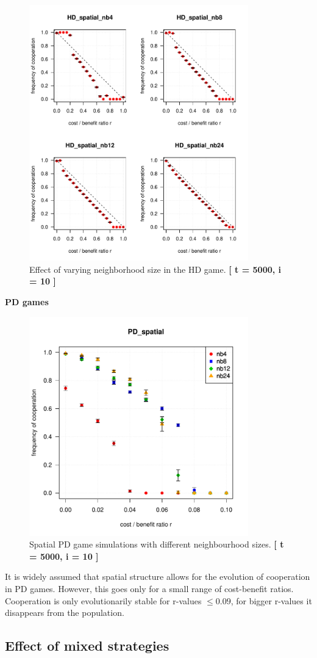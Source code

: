 \begin{figure}[H]
	\centering 
	\includegraphics[width=9.5cm]{task2_4plot}
	\caption{Effect of varying neighborhood size in the HD game.  \textbf{[ t = 5000, i = 10 ]} }\label{fig: task2_4plot}
\end{figure}



\textbf{PD games} 


\begin{figure}[H]
	\centering 
	\includegraphics[width=9.5cm]{task2_multiplot}
	\caption{Spatial PD game simulations with different neighbourhood sizes.  \textbf{[ t = 5000, i = 10 ]} }\label{fig: task2_multiplot}
\end{figure}


It is widely assumed that spatial structure allows for the evolution of cooperation in PD games. However, this goes only for a small range of cost-benefit ratios. Cooperation is only evolutionarily stable for r-values $ \leq 0.09$, for bigger r-values it disappears from the population.\\
 


\subsection{Effect of mixed strategies}

